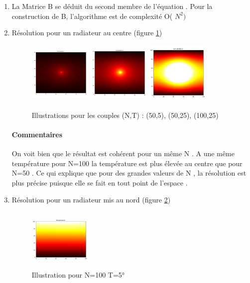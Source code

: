 \documentclass{article}
\begin{document}
\begin{enumerate}
\begin{enumerate}
 		\item{La Matrice B se déduit du second membre de l'équation . 
 		Pour la construction de B, l'algorithme est de complexité O( $N^2)$   } 
   	\item { Résolution pour un radiateur au centre (figure \ref{centre}) }  
   	\begin{figure}[h]
   	\centering
   		\begin{minipage}[c]{\linewidth}
   			\centering
   			\includegraphics[width=3cm,height=3cm]{centreN50T5.png}
   			\includegraphics[width=3cm,height=3cm]{centreN50T25.png}
   			\includegraphics[width=3cm,height=3cm]{centreN100T25.png}
   			\caption{Illustrations pour les couples (N,T) : (50,5), (50,25), (100,25) }
   			\label{centre}
   	\end{minipage} \hfill 
\end{figure} 

\paragraph{Commentaires } 
On voit bien que le résultat est cohérent pour un même N  . 
A une même température pour N=100 la température est plus élevée au centre que pour N=50 . 
Ce qui explique que pour des grandes valeurs de N , la résolution est plus précise puisque elle se fait en tout point de l'espace .  
   	\item{Résolution pour un radiateur mis au nord (figure \ref{nord})} 
   	\begin{figure}[h]
   	\centering
   		\begin{minipage}[c]{.46\linewidth}
   			\centering
   			\includegraphics[width=3cm,height=3cm]{coteN100T5.png}
   			\caption{Illustration pour N=100 T=5° }
   			\label{radiateur sur le cote ( N=100 ,T=5°)}
   		\end{minipage}
   		\label{nord}
\end{figure} 

\end{enumerate}
\end{enumerate}
\end{document}
